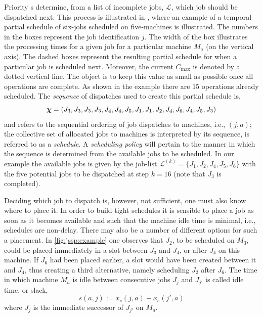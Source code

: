 \documentclass[smallextended]{svjour3}
\begin{document}
Priority \dr s determine, from a list of incomplete jobs, 
$\mathcal{L}$, which job should be dispatched next. This process is illustrated 
in , where an example of 
a temporal partial schedule of six-jobs scheduled on five-machines is illustrated. 
The numbers in the boxes represent the job identification $j$. 
The width of the box illustrates the processing times for a given job for a 
particular machine $M_a$ (on the vertical axis). 
The dashed boxes represent the resulting partial schedule for when a particular 
job is scheduled next. 
Moreover, the current $C_{\max}$ is denoted by a dotted vertical line. 
The object is to keep this value as small as possible once all operations are 
complete. As shown in the example there are $15$ operations already scheduled. 
The \textit{sequence} of dispatches used to create this partial schedule is,
\begin{equation}
	\bm \chi=\left(J_3,J_3,J_3,J_3,J_4,J_4,J_5,J_1,J_1,J_2,J_4,J_6,J_4,J_5,J_3\right)
\end{equation}
and refers to the sequential ordering of job dispatches to machines, i.e., $(j,a)$; 
the collective set of allocated jobs to machines is interpreted by its 
sequence, is referred to as a \emph{schedule}.
A \emph{scheduling policy} will pertain to the manner in which 
the sequence is determined from the available jobs to be scheduled. 
In our example the available jobs is given by the job-list
$\mathcal{L}^{(k)}=\{J_1,J_2,J_4,J_5,J_6\}$ with the five potential jobs 
to be dispatched at step $k=16$ (note that $J_3$ is completed).

Deciding which job to dispatch is, however, not sufficient, one must also know 
where to place it. In order to build tight schedules it is sensible to place a 
job as soon as it becomes available and such that the machine idle time is 
minimal, i.e., schedules are non-delay. 
There may also be a number of different options for such a placement. 
In \cref{fig:jssp:example} one observes that $J_2$, to be scheduled on $M_3$, 
could be placed immediately in a slot between $J_3$ and $J_4$, or after $J_4$ 
on this machine. 
If $J_6$ had been placed earlier, a slot would have been created between it and 
$J_4$, thus creating a third alternative, namely scheduling $J_2$ after $J_6$. 
The time in which machine $M_a$ is idle between consecutive jobs $J_j$ and 
$J_{j'}$ is called idle time, or slack, 
\begin{equation} 
s(a,j):=x_s(j,a)-x_e(j',a) \label{eq:slack}
\end{equation}
where $J_j$ is the immediate successor of $J_{j'}$ on $M_a$. 
\end{document}
